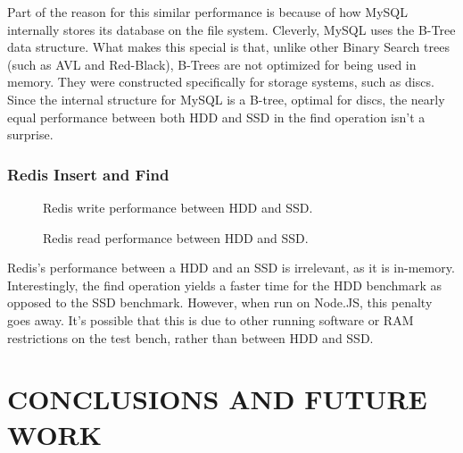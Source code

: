 \documentclass[letterpaper, 10 pt, conference]{ieeeconf}
\begin{document}
Part of the reason for this similar performance is because of how MySQL internally stores its database on the file system. Cleverly, MySQL uses the B-Tree data structure. What makes this special is that, unlike other Binary Search trees (such as AVL and Red-Black), B-Trees are not optimized for being used in memory. They were constructed specifically for storage systems, such as discs. Since the internal structure for MySQL is a B-tree, optimal for discs, the nearly equal performance between both HDD and SSD in the find operation isn't a surprise.
\subsubsection{Redis Insert and Find}
\begin{figure}[h]
    \centering
    
        \caption{Redis write performance between HDD and SSD.}
    \label{fig:mesh1}
\end{figure}
\begin{figure}[h]
    \centering
    
        \caption{Redis read performance between HDD and SSD.}
    \label{fig:mesh1}
\end{figure}
Redis's performance between a HDD and an SSD is irrelevant, as it is in-memory. Interestingly, the find operation yields a faster time for the HDD benchmark as opposed to the SSD benchmark. However, when run on Node.JS, this penalty goes away. It's possible that this is due to other running software or RAM restrictions on the test bench, rather than between HDD and SSD.
\section{CONCLUSIONS AND FUTURE WORK}
\end{document}
